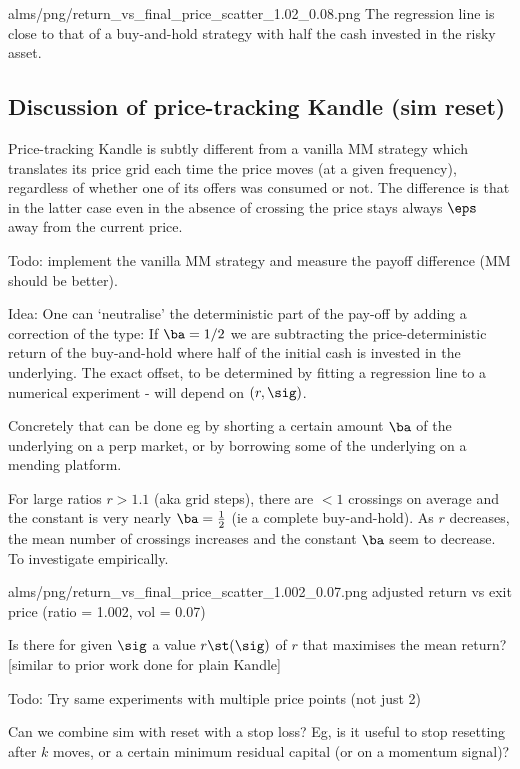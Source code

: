 \documentclass[oneside]{article}
\begin{document}
\IG{250pt}
{alms/png/return_vs_final_price_scatter_1.02_0.08.png}
{\label{simReset} The regression line is close to that of a buy-and-hold strategy
with half the cash invested in the risky asset.}


\subsection{Discussion of price-tracking Kandle (sim reset)}
Price-tracking Kandle is subtly different from a vanilla MM strategy which translates its price grid each time the price moves (at a given frequency),
regardless of whether one of its offers was consumed or not. 
The difference is that in the latter case even in the absence of crossing the price stays always $\eps$ away from the current price.

Todo: implement the vanilla MM strategy and measure the payoff difference (MM should be better).

Idea: 
One can `neutralise' the deterministic part of the pay-off by adding 
a correction of the type:
If $\ba=1/2$ we are subtracting the price-deterministic return of the buy-and-hold
where half of the initial cash is invested in the underlying.
The exact offset, to be determined by fitting a regression line
to a numerical experiment - will depend on $(r,\sig)$.

Concretely that can be done eg by shorting a certain amount $\ba$ of the underlying on a perp market,
or by borrowing some of the underlying on a mending platform. 

For large ratios $r>1.1$ (aka grid steps), 
there are $<1$ crossings on average and the constant is very nearly $\ba =\frac12$ (ie a complete buy-and-hold).
As $r$ decreases, the mean number of crossings increases and the constant $\ba$ seem to decrease.
To investigate empirically.

\IG{200pt}
{alms/png/return_vs_final_price_scatter_1.002_0.07.png}
{adjusted return vs exit price (ratio = 1.002, vol = 0.07)}

\QS[1] Is there for given $\sig$ a value $r\st(\sig)$ of $r$ that maximises the mean return? [similar to prior work done
for plain Kandle]

Todo: Try same experiments with multiple price points (not just 2)

Can we combine sim with reset with a stop loss? Eg, is it useful to stop resetting after $k$ moves,
or a certain minimum residual capital (or on a momentum signal)?
\end{document}
